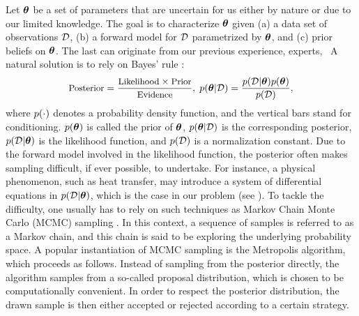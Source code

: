 Let ${\boldsymbol\theta}$ be a set of parameters that are uncertain for us either by nature or due to our limited knowledge. The goal is to characterize ${\boldsymbol\theta}$ given (a) a data set of observations $\mathcal{D}$, (b) a forward model for $\mathcal{D}$ parametrized by ${\boldsymbol\theta}$, and (c) prior beliefs on ${\boldsymbol\theta}$. The last can originate from our previous experience, experts, \etc\ A natural solution is to rely on Bayes' rule \cite{gelman2004}:
\[
  \text{\small Posterior} = \frac{\text{\small Likelihood} \times \text{\small Prior}}{\text{\small Evidence}}, \; \f{\vparam | \Data} = \frac{\f{\Data | \vparam} \f{\vparam}}{\f{\Data}},
\]
where $\f{\cdot}$ denotes a probability density function, and the vertical bars stand for conditioning. $\f{\vparam}$ is called the prior of ${\boldsymbol\theta}$, $\f{\vparam | \Data}$ is the corresponding posterior, $\f{\Data | \vparam}$ is the likelihood function, and $\f{\Data}$ is a normalization constant.
Due to the forward model involved in the likelihood function, the posterior often makes sampling difficult, if ever possible, to undertake.
For instance, a physical phenomenon, such as heat transfer, may introduce a system of differential equations in $\f{\Data | \vparam}$, which is the case in our problem (see ).
To tackle the difficulty, one usually has to rely on such techniques as Markov Chain Monte Carlo (MCMC) sampling \cite{gelman2004}.
In this context, a sequence of samples is referred to as a Markov chain, and this chain is said to be exploring the underlying probability space.
A popular instantiation of MCMC sampling is the Metropolis algorithm, which proceeds as follows. Instead of sampling from the posterior directly, the algorithm samples from a so-called proposal distribution, which is chosen to be computationally convenient. In order to respect the posterior distribution, the drawn sample is then either accepted or rejected according to a certain strategy.
